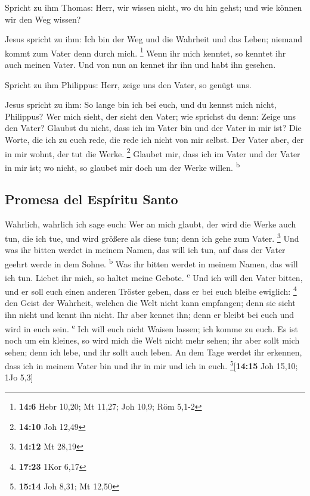  Spricht zu ihm Thomas: Herr, wir wissen nicht, wo du hin
gehst; und wie können wir den Weg wissen?

 Jesus spricht zu ihm: Ich bin der Weg und die Wahrheit
und das Leben; niemand kommt zum Vater denn durch mich. \footnote{\textbf{14:6}
  Hebr 10,20; Mt 11,27; Joh 10,9; Röm 5,1-2}  Wenn ihr
mich kenntet, so kenntet ihr auch meinen Vater. Und von nun an kennet
ihr ihn und habt ihn gesehen.

 Spricht zu ihm Philippus: Herr, zeige uns den Vater, so
genügt uns.

 Jesus spricht zu ihm: So lange bin ich bei euch, und du
kennst mich nicht, Philippus? Wer mich sieht, der sieht den Vater; wie
sprichst du denn: Zeige uns den Vater?  Glaubst du nicht,
dass ich im Vater bin und der Vater in mir ist? Die Worte, die ich zu
euch rede, die rede ich nicht von mir selbst. Der Vater aber, der in mir
wohnt, der tut die Werke. \footnote{\textbf{14:10} Joh 12,49}
 Glaubet mir, dass ich im Vater und der Vater in mir ist;
wo nicht, so glaubet mir doch um der Werke willen. \textsuperscript{b}

\hypertarget{promesa-del-espuxedritu-santo}{%
\subsection{Promesa del Espíritu
Santo}\label{promesa-del-espuxedritu-santo}}

 Wahrlich, wahrlich ich sage euch: Wer an mich glaubt,
der wird die Werke auch tun, die ich tue, und wird größere als diese
tun; denn ich gehe zum Vater. \footnote{\textbf{14:12} Mt 28,19}
 Und was ihr bitten werdet in meinem Namen, das will ich
tun, auf dass der Vater geehrt werde in dem Sohne. \textsuperscript{b}
 Was ihr bitten werdet in meinem Namen, das will ich tun.
 Liebet ihr mich, so haltet meine Gebote.
\textsuperscript{c}  Und ich will den Vater bitten, und
er soll euch einen anderen Tröster geben, dass er bei euch bleibe
ewiglich: \footnote{\textbf{17:23} 1Kor 6,17}  den Geist
der Wahrheit, welchen die Welt nicht kann empfangen; denn sie sieht ihn
nicht und kennt ihn nicht. Ihr aber kennet ihn; denn er bleibt bei euch
und wird in euch sein. \textsuperscript{e}  Ich will euch
nicht Waisen lassen; ich komme zu euch.  Es ist noch um
ein kleines, so wird mich die Welt nicht mehr sehen; ihr aber sollt mich
sehen; denn ich lebe, und ihr sollt auch leben.  An dem
Tage werdet ihr erkennen, dass ich in meinem Vater bin und ihr in mir
und ich in euch. \footnote{\textbf{15:14} Joh 8,31; Mt 12,50}{[}\textbf{14:15}
Joh 15,10; 1Jo 5,3{]}

